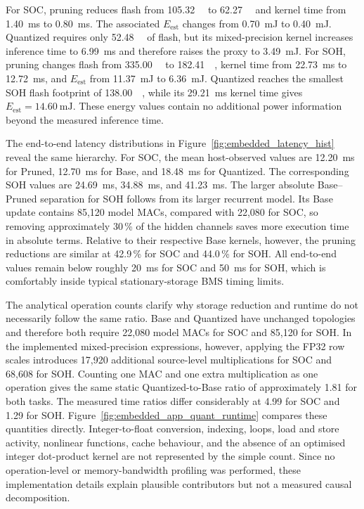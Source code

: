 \documentclass[
    a4paper,
    12pt,
    titlepage,
    bibliography=totoc,
    twoside=on,
    parskip=false,
    numbers=noenddot,
    cleardoublepage=empty,
    DIV=12,
    BCOR=12.0mm,
    headheight=36pt,
    headings=openright
]{scrreprt}
\begin{document}
For SOC, pruning reduces flash from \SI{105.32}{\kilo\byte} to \SI{62.27}{\kilo\byte} and kernel time from \SI{1.40}{\milli\second} to \SI{0.80}{\milli\second}. The associated $E_{\mathrm{est}}$ changes from \SI{0.70}{\milli\joule} to \SI{0.40}{\milli\joule}. Quantized requires only \SI{52.48}{\kilo\byte} of flash, but its mixed-precision kernel increases inference time to \SI{6.99}{\milli\second} and therefore raises the proxy to \SI{3.49}{\milli\joule}. For SOH, pruning changes flash from \SI{335.00}{\kilo\byte} to \SI{182.41}{\kilo\byte}, kernel time from \SI{22.73}{\milli\second} to \SI{12.72}{\milli\second}, and $E_{\mathrm{est}}$ from \SI{11.37}{\milli\joule} to \SI{6.36}{\milli\joule}. Quantized reaches the smallest SOH flash footprint of \SI{138.00}{\kilo\byte}, while its \SI{29.21}{\milli\second} kernel time gives $E_{\mathrm{est}}=\SI{14.60}{\milli\joule}$. These energy values contain no additional power information beyond the measured inference time.

The end-to-end latency distributions in Figure~\ref{fig:embedded_latency_hist} reveal the same hierarchy. For SOC, the mean host-observed values are \SI{12.20}{\milli\second} for Pruned, \SI{12.70}{\milli\second} for Base, and \SI{18.48}{\milli\second} for Quantized. The corresponding SOH values are \SI{24.69}{\milli\second}, \SI{34.88}{\milli\second}, and \SI{41.23}{\milli\second}. The larger absolute Base--Pruned separation for SOH follows from its larger recurrent model. Its Base update contains 85,120 model MACs, compared with 22,080 for SOC, so removing approximately 30\,\% of the hidden channels saves more execution time in absolute terms. Relative to their respective Base kernels, however, the pruning reductions are similar at 42.9\,\% for SOC and 44.0\,\% for SOH. All end-to-end values remain below roughly \SI{20}{\milli\second} for SOC and \SI{50}{\milli\second} for SOH, which is comfortably inside typical stationary-storage BMS timing limits.\autocite{plettBatteryManagementSystems2015,berecibarCriticalReviewState2016}

The analytical operation counts clarify why storage reduction and runtime do not necessarily follow the same ratio. Base and Quantized have unchanged topologies and therefore both require 22,080 model MACs for SOC and 85,120 for SOH. In the implemented mixed-precision expressions, however, applying the FP32 row scales introduces 17,920 additional source-level multiplications for SOC and 68,608 for SOH. Counting one MAC and one extra multiplication as one operation gives the same static Quantized-to-Base ratio of approximately 1.81 for both tasks. The measured time ratios differ considerably at 4.99 for SOC and 1.29 for SOH. Figure~\ref{fig:embedded_app_quant_runtime} compares these quantities directly. Integer-to-float conversion, indexing, loops, load and store activity, nonlinear functions, cache behaviour, and the absence of an optimised integer dot-product kernel are not represented by the simple count. Since no operation-level or memory-bandwidth profiling was performed, these implementation details explain plausible contributors but not a measured causal decomposition.
\end{document}
